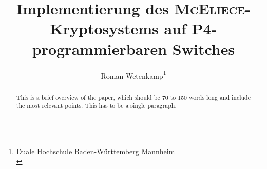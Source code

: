\documentclass[utf8, biblatex]{lni}
\begin{document}
\title[\textsc{McEliece}-Verfahren auf P4-Switches]{Implementierung des \textsc{McEliece}-Kryptosystems auf P4-programmierbaren Switches}
\author[Roman Wetenkamp]
{Roman Wetenkamp\footnote{Duale Hochschule Baden-Württemberg Mannheim\\ }}
\editor{} %
\maketitle
\begin{abstract}
This is a brief overview of the paper, which should be 70 to 150 words long and
include the most relevant points. This has to be a single paragraph.
\end{abstract}
\end{document}
